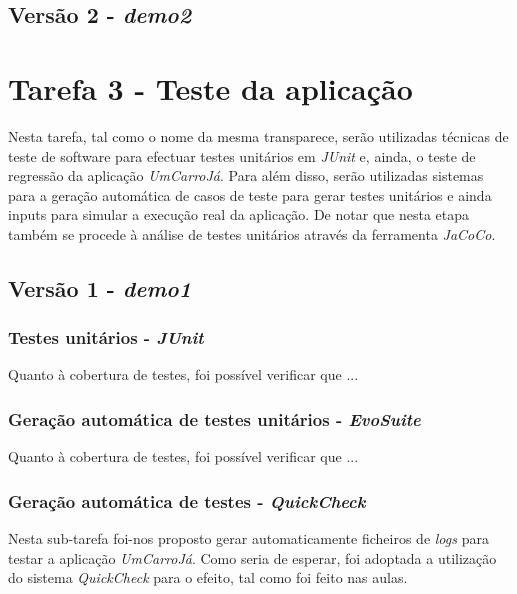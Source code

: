 \documentclass[a4paper]{report}
\begin{document}
\subsection{Versão 2 - \textit{demo2}}

\section{Tarefa 3 - Teste da aplicação}
Nesta tarefa, tal como o nome da mesma transparece, serão utilizadas técnicas de teste de software para efectuar testes unitários em \textit{JUnit} e, ainda, o
teste de regressão da aplicação \textit{UmCarroJá}. Para além disso, serão utilizadas sistemas para a geração automática de casos de teste para gerar testes unitários e ainda inputs para simular a execução real da aplicação. De notar que nesta etapa também se procede à análise de testes unitários através da ferramenta \textit{JaCoCo}.

\subsection{Versão 1 - \textit{demo1}}

\subsubsection{Testes unitários - \textit{JUnit}}

Quanto à cobertura de testes, foi possível verificar que ...

\subsubsection{Geração automática de testes unitários - \textit{EvoSuite}}

Quanto à cobertura de testes, foi possível verificar que ...

\subsubsection{Geração automática de testes - \textit{QuickCheck}}
Nesta sub-tarefa foi-nos proposto gerar automaticamente ficheiros de \textit{logs} para testar a aplicação \textit{UmCarroJá}. Como seria de esperar, foi adoptada a utilização do sistema \textit{QuickCheck} para o efeito, tal como foi feito nas aulas.
\end{document}

